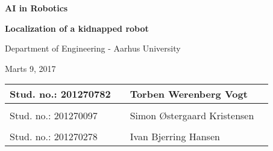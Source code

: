 
\centerline{\Huge\bfseries\color{ThemeColor} AI in Robotics}

\vspace{1em}
\centerline{\Large\bfseries\color{BlackColor} Localization of a kidnapped robot}



\vspace{5em}
\centerline{\large\bfseries\color{BlackColor}}
\centerline{\large\color{BlackColor}Department of Engineering - Aarhus University}

\vspace{0.5em}
\centerline{\large\color{BlackColor} Marts 9, 2017}

\vspace{25em}

\begin{center}
   \begin{tabular}{ l p{3cm} l l }
   Stud. no.: 201270782 && Torben Werenberg Vogt & \\\hline
   & & \\
   Stud. no.: 201270097 && Simon Østergaard Kristensen & \\\hline
   & & \\
   Stud. no.: 201270278 && Ivan Bjerring Hansen & \\\hline
   \end{tabular}
\end{center}
\thispagestyle{empty} %
\restoregeometry

